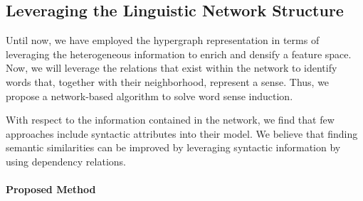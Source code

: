 \subsection{Leveraging the Linguistic Network Structure}
Until now, we have employed the hypergraph representation in terms of leveraging the heterogeneous information to enrich and densify a feature space.
Now, we will leverage the relations that exist within the network to identify words that, together with their neighborhood, represent a sense. Thus, we propose a network-based algorithm to solve word sense induction. 






%



With respect to the information contained in the network, we find that few approaches include syntactic attributes into their model. We believe that finding semantic similarities can be improved by leveraging syntactic information by using dependency relations. 




\paragraph{Proposed Method}
	
